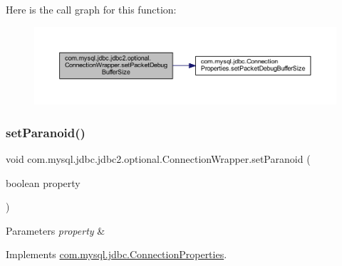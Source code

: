 Here is the call graph for this function\+:
\nopagebreak
\begin{figure}[H]
\begin{center}
\leavevmode
\includegraphics[width=350pt]{classcom_1_1mysql_1_1jdbc_1_1jdbc2_1_1optional_1_1_connection_wrapper_aaf10a4fb7d7079348a8ad47aafc4dedb_cgraph}
\end{center}
\end{figure}
\mbox{\label{classcom_1_1mysql_1_1jdbc_1_1jdbc2_1_1optional_1_1_connection_wrapper_a246bc6ed913e7b8cf4950a88744c3d04}} 
\subsubsection{\texorpdfstring{set\+Paranoid()}{setParanoid()}}
{\footnotesize\ttfamily void com.\+mysql.\+jdbc.\+jdbc2.\+optional.\+Connection\+Wrapper.\+set\+Paranoid (\begin{DoxyParamCaption}\item[{boolean}]{property }\end{DoxyParamCaption})}


\begin{DoxyParams}{Parameters}
{\em property} & \\
\hline
\end{DoxyParams}


Implements \mbox{\hyperlink{interfacecom_1_1mysql_1_1jdbc_1_1_connection_properties_a01cf4f506ad942b96a36708c33221a48}{com.\+mysql.\+jdbc.\+Connection\+Properties}}.

